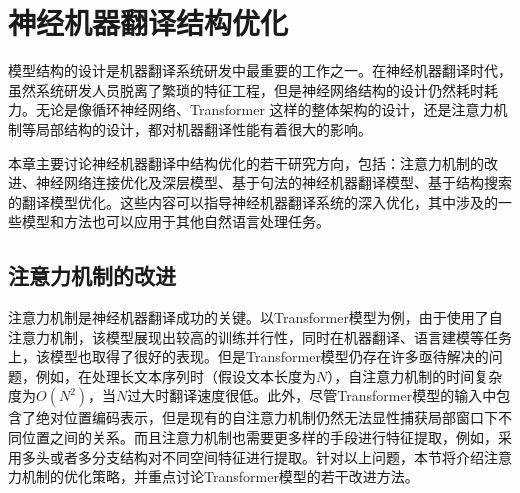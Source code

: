 
%


\renewcommand\figurename{图}%
\renewcommand\tablename{表}%


\chapter{神经机器翻译结构优化}

\parinterval 模型结构的设计是机器翻译系统研发中最重要的工作之一。在神经机器翻译时代，虽然系统研发人员脱离了繁琐的特征工程，但是神经网络结构的设计仍然耗时耗力。无论是像循环神经网络、Transformer 这样的整体架构的设计，还是注意力机制等局部结构的设计，都对机器翻译性能有着很大的影响。

\parinterval 本章主要讨论神经机器翻译中结构优化的若干研究方向，包括：注意力机制的改进、神经网络连接优化及深层模型、基于句法的神经机器翻译模型、基于结构搜索的翻译模型优化。这些内容可以指导神经机器翻译系统的深入优化，其中涉及的一些模型和方法也可以应用于其他自然语言处理任务。


\sectionnewpage
\section{注意力机制的改进}

\parinterval 注意力机制是神经机器翻译成功的关键。以Transformer模型为例，由于使用了自注意力机制，该模型展现出较高的训练并行性，同时在机器翻译、语言建模等任务上，该模型也取得了很好的表现。但是Transformer模型仍存在许多亟待解决的问题，例如，在处理长文本序列时（假设文本长度为$N$），自注意力机制的时间复杂度为$O(N^2)$，当$N$过大时翻译速度很低。此外，尽管Transformer模型的输入中包含了绝对位置编码表示，但是现有的自注意力机制仍然无法显性捕获局部窗口下不同位置之间的关系。而且注意力机制也需要更多样的手段进行特征提取，例如，采用多头或者多分支结构对不同空间特征进行提取。针对以上问题，本节将介绍注意力机制的优化策略，并重点讨论Transformer模型的若干改进方法。

